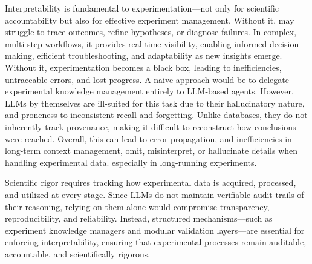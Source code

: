 Interpretability is fundamental to experimentation—not only for scientific accountability but also for effective experiment management. Without it, \sys may struggle to trace outcomes, refine hypotheses, or diagnose failures. In complex, multi-step workflows, it provides real-time visibility, enabling informed decision-making, efficient troubleshooting, and adaptability as new insights emerge. Without it, experimentation becomes a black box, leading to inefficiencies, untraceable errors, and lost progress.
A naive approach would be to delegate experimental knowledge management entirely to LLM-based agents. 
However, LLMs by themselves are ill-suited for this task due to their 
hallucinatory nature, and proneness to inconsistent recall and forgetting.
Unlike databases, they do not inherently track provenance, making it difficult to reconstruct how conclusions were reached. 
Overall, this can lead to error propagation, and inefficiencies in long-term context management, omit, misinterpret, or hallucinate details when handling experimental data.
especially in long-running experiments.

Scientific rigor requires tracking how experimental data is acquired, processed, and utilized at every stage. Since LLMs do not maintain verifiable audit trails of their reasoning, relying on them alone would compromise transparency, reproducibility, and reliability. Instead, structured mechanisms—such as experiment knowledge managers and modular validation layers—are essential for enforcing interpretability, ensuring that experimental processes remain auditable, accountable, and scientifically rigorous.
\fi


